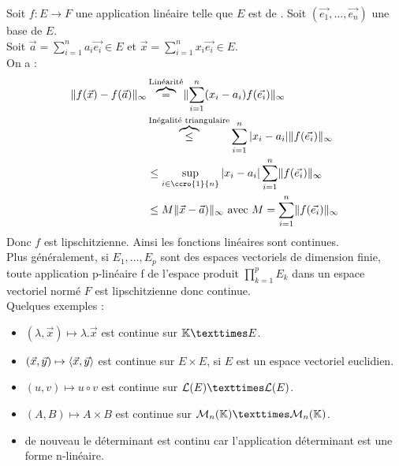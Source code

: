 \documentclass{book}
\begin{document}
\begin{Exemple}
Soit $f:E \to F$ une application linéaire telle que $E$ est de . Soit $(\vec{e_1},\dots,\vec{e_n})$ une base  de $E$.\\
Soit $\vec{a}=\sum_{i=1}^n a_i \vec{e_i}\in E$ et $\vec{x}=\sum_{i=1}^n x_i \vec{e_i}\in E$.\\
On a :
$$\begin{aligned}
\norme{f(\vec{x})-f(\vec{a})}_\infty&\overbrace{=}^{\text{Linéarité}}\norme{ \sum_{i=1}^n (x_i-a_i)f(\vec{e_i})}_{\infty}\\
&\overbrace{\leq }^{\text{Inégalité triangulaire}}\sum_{i=1}^n |x_i-a_i| \norme{ f(\vec{e_i})}_{\infty}\\
&\leq \sup_{i\in\ccro{1}{n} } |x_i-a_i| \sum_{i=1}^n \norme{ f(\vec{e_i})}_{\infty}\\
&\leq M \norme{ \vec{x}-\vec{a})}_{\infty}\text{ avec }M=\sum_{i=1}^n \norme{ f(\vec{e_i})}_{\infty}\\
\end{aligned}$$ 
Donc $f$ est lipschitzienne. Ainsi les fonctions linéaires sont continues.\\
Plus généralement, si $E_1,\dots, E_p$ sont des espaces vectoriels de dimension finie, toute
application p-linéaire f de l'espace produit $\prod_{k=1}^p E_k$ dans un espace vectoriel normé $F$ est lipschitzienne donc continue.\\
Quelques exemples :
\begin{itemize}
\item $(\lambda, \vec{x})\mapsto \lambda.\vec{x}$ est continue sur $\K × E$.
\item $(\vec{x}, \vec{y}) \mapsto \langle\vec{x},\vec{y}\rangle$ est continue sur $E × E$, si $E$ est un espace vectoriel euclidien.
\item $(u, v) \mapsto u \circ v$ est continue sur $\LE × \LE$. 
\item $(A, B)\mapsto A × B$ est continue sur $\MnK × \MnK$.
\item de nouveau le déterminant est continu car l'application déterminant est une forme n-linéaire.
\end{itemize}
\end{Exemple}
\end{document}
